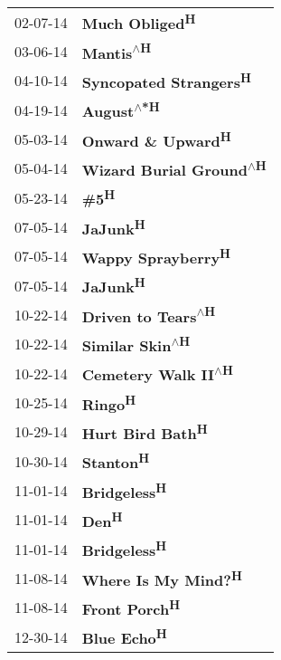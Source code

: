 \begin{supertabular}{p{0.25\columnwidth}p{0.75\columnwidth}}
 02-07-14 &                  \textbf{Much Obliged\textsuperscript{H}} \\
 03-06-14 &                \textbf{Mantis\textsuperscript{$\wedge$H}} \\
 04-10-14 &          \textbf{Syncopated Strangers\textsuperscript{H}} \\
 04-19-14 &               \textbf{August\textsuperscript{$\wedge$*H}} \\
 05-03-14 &              \textbf{Onward \& Upward\textsuperscript{H}} \\
 05-04-14 &  \textbf{Wizard Burial Ground\textsuperscript{$\wedge$H}} \\
 05-23-14 &                           \textbf{\#5\textsuperscript{H}} \\
 07-05-14 &                        \textbf{JaJunk\textsuperscript{H}} \\
 07-05-14 &              \textbf{Wappy Sprayberry\textsuperscript{H}} \\
 07-05-14 &                        \textbf{JaJunk\textsuperscript{H}} \\
 10-22-14 &       \textbf{Driven to Tears\textsuperscript{$\wedge$H}} \\
 10-22-14 &          \textbf{Similar Skin\textsuperscript{$\wedge$H}} \\
 10-22-14 &      \textbf{Cemetery Walk II\textsuperscript{$\wedge$H}} \\
 10-25-14 &                         \textbf{Ringo\textsuperscript{H}} \\
 10-29-14 &                \textbf{Hurt Bird Bath\textsuperscript{H}} \\
 10-30-14 &                       \textbf{Stanton\textsuperscript{H}} \\
 11-01-14 &                    \textbf{Bridgeless\textsuperscript{H}} \\
 11-01-14 &                           \textbf{Den\textsuperscript{H}} \\
 11-01-14 &                    \textbf{Bridgeless\textsuperscript{H}} \\
 11-08-14 &             \textbf{Where Is My Mind?\textsuperscript{H}} \\
 11-08-14 &                   \textbf{Front Porch\textsuperscript{H}} \\
 12-30-14 &                     \textbf{Blue Echo\textsuperscript{H}} \\
\end{supertabular}
